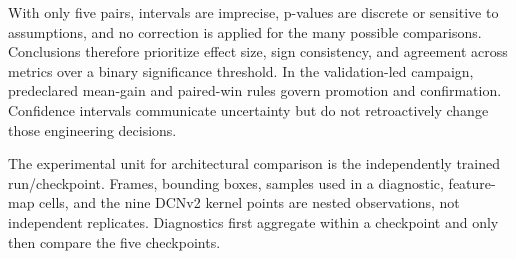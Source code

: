 With only five pairs, intervals are imprecise, p-values are discrete or
sensitive to assumptions, and no correction is applied for the many possible
comparisons. Conclusions therefore prioritize effect size, sign consistency,
and agreement across metrics over a binary significance threshold. In the
validation-led campaign, predeclared mean-gain and paired-win rules govern
promotion and confirmation. Confidence intervals communicate uncertainty but
do not retroactively change those engineering decisions.

The experimental unit for architectural comparison is the independently
trained run/checkpoint. Frames, bounding boxes, samples used in a diagnostic,
feature-map cells, and the nine DCNv2 kernel points are nested observations,
not independent replicates. Diagnostics first aggregate within a checkpoint
and only then compare the five checkpoints.
